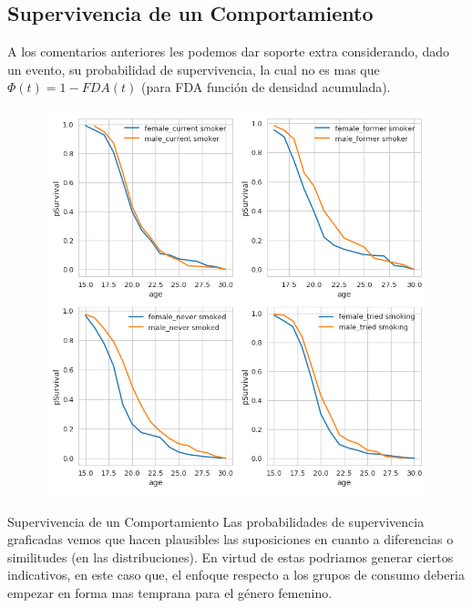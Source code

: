 \documentclass[8pt]{beamer}
\begin{document}
\subsection{Supervivencia de un Comportamiento}
\begin{frame}
A los comentarios anteriores les podemos dar soporte extra considerando, dado un evento, su probabilidad de supervivencia, la cual 
no es mas que $\Phi(t)=1-FDA(t)$  (para FDA función de densidad acumulada).

\setlength{\columnsep}{80pt} 
\begin{multicols}{2}
\begin{minipage}[t]{0.6\textwidth}
 \begin{figure}
 \includegraphics[scale=0.25]{smoking_survival}
 \end{figure}
  \end{minipage}
\begin{minipage}[t]{0.4\textwidth}
\begin{block}{Supervivencia de un Comportamiento}
Las probabilidades de supervivencia graficadas vemos que hacen plausibles las suposiciones en cuanto a diferencias o similitudes 
(en las distribuciones). En virtud de estas podriamos generar ciertos indicativos, en este caso que, el enfoque respecto a los 
grupos de consumo deberia empezar en forma mas temprana para el género femenino.
\end{block}
\end{minipage}
\end{multicols}
\end{frame}
\end{document}
